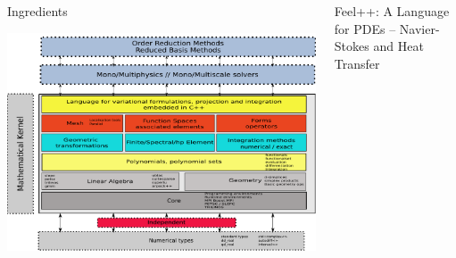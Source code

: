 \documentclass[final,utf8,,hyperref={pdfpagelabels=false}]{beamer}
\begin{document}
\begin{frame}[containsverbatim]{}
\begin{columns}[t]
    \begin{block}{Ingredients}
      \centerline{\includegraphics[width=\linewidth]{arch2.pdf}}
    \end{block}
    \vfill
    \begin{block}{Feel++: A Language for PDEs -- Navier-Stokes and Heat Transfer}
   

\end{block}
\end{columns}
\end{frame}
\end{document}
